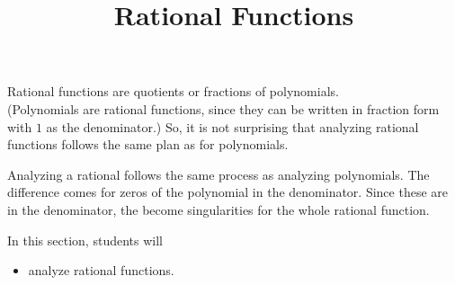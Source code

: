 \documentclass{ximera}
\title{Rational Functions}
\begin{document}
\begin{abstract}
\end{abstract}
\maketitle












Rational functions are quotients or fractions of polynomials.  \\


(Polynomials are rational functions, since they can be written in fraction form with $1$ as the denominator.)  So, it is not surprising that analyzing rational functions follows the same plan as for polynomials.

Analyzing a rational follows the same process as analyzing polynomials.  The difference comes for zeros of the polynomial in the denominator.  Since these are in the denominator, the become singularities for the whole rational function.


























\begin{sectionOutcomes}
In this section, students will 

\begin{itemize}
\item analyze rational functions.
\end{itemize}
\end{sectionOutcomes}
\end{document}
